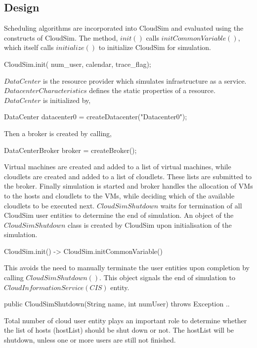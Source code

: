 \documentclass{llncs}
\begin{document}
\subsection{Design}
Scheduling algorithms are incorporated into CloudSim and evaluated using the constructs of CloudSim. The method, $init()$ calls $initCommonVariable()$, which itself calls $initialize()$ to initialize CloudSim for simulation.
\begin{verbatimtab}
CloudSim.init(
    num_user, calendar, trace_flag);
\end{verbatimtab}
$DataCenter$ is the resource provider which simulates infrastructure as a service. $DatacenterCharacteristics$ defines the static properties of a resource. $DataCenter$ is initialized by,
\begin{verbatimtab}
DataCenter datacenter0 =
    createDatacenter("Datacenter0");
\end{verbatimtab}
Then a broker is created by calling,
\begin{verbatimtab}
DataCenterBroker broker = createBroker();
\end{verbatimtab}
Virtual machines are created and added to a list of virtual machines, while cloudlets are created and added to a list of cloudlets. These lists are submitted to the broker. Finally simulation is started and broker handles the allocation of VMs to the hosts and cloudlets to the VMs, while deciding which of the available cloudlets to be executed next. $CloudSimShutdown$ waits for termination of all CloudSim user entities to determine the end of simulation. An object of the $CloudSimShutdown$ class is created by CloudSim upon initialisation of the simulation.
\begin{verbatimtab}
CloudSim.init() ->
    CloudSim.initCommonVariable()
\end{verbatimtab}
This avoids the need to manually terminate the user entities upon completion by calling $CloudSimShutdown()$. This object signals the end of simulation to $CloudInformationService (CIS)$ entity.
\begin{verbatimtab}
public CloudSimShutdown(String name,
    int numUser) throws Exception { .. }
\end{verbatimtab}
Total number of cloud user entity plays an important role to determine whether the list of hosts (hostList) should be shut down or not. The hostList will be shutdown, unless one or more users are still not finished.
\end{document}
